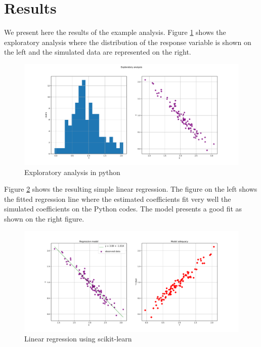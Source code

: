 \section{Results}


We present here the results of the example analysis. Figure \ref{fig:exploratory_analysis} shows the exploratory analysis where the distribution of the response variable is shown on the left and the simulated data are represented on the right.

\begin{figure}
\centering
\includegraphics[width=\textwidth]{figures/fig_exploratory_analysis.pdf}
\caption{Exploratory analysis in python}
\label{fig:exploratory_analysis}
\end{figure}

Figure \ref{fig:linear_regression} shows the resulting simple linear regression. The figure on the left shows the fitted regression line where the estimated coefficients fit very well the simulated coefficients on the Python codes. The model presents a good fit as shown on the right figure. 

\begin{figure}
\centering
\includegraphics[width=\textwidth]{figures/fig_linear_regression.pdf}
\caption{Linear regression using scikit-learn}
\label{fig:linear_regression}
\end{figure}